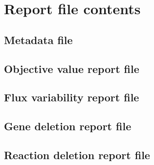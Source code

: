 \section{Report file contents}

\subsection{Metadata file}
\label{sec:meta}

\subsection{Objective value report file}
\label{sec:obj}

\subsection{Flux variability report file}
\label{sec:fva}

\subsection{Gene deletion report file}
\label{sec:genes}

\subsection{Reaction deletion report file}
\label{sec:rxns}
